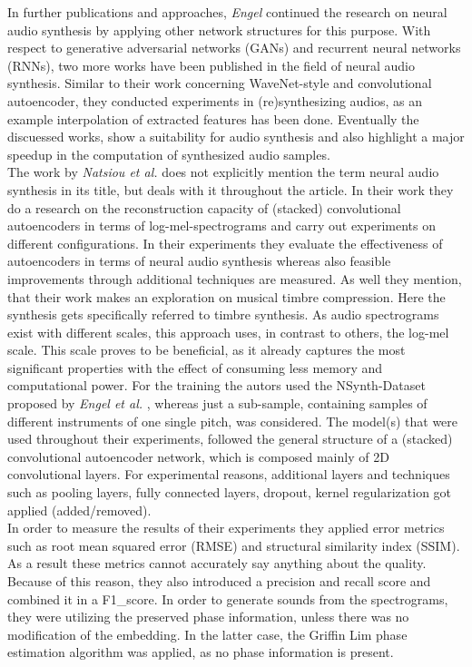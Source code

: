 In further publications and approaches, \textit{Engel} continued the research on neural audio synthesis by applying other network structures for this purpose. With respect to generative adversarial networks (GANs) and recurrent neural networks (RNNs), two more works have been published in the field of neural audio synthesis. \cite{Engel2019, hantrakul2019fast} Similar to their work concerning WaveNet-style and convolutional autoencoder, they conducted experiments in (re)synthesizing audios, as an example interpolation of extracted features has been done. Eventually the discuessed works, show a suitability for audio synthesis and also highlight a major speedup in the computation of synthesized audio samples.\\

The work by \textit{Natsiou et al.} does not explicitly mention the term neural audio synthesis in its title, but deals with it throughout the article. \cite{Natsiou2023} In their work they do a research on the reconstruction capacity of (stacked) convolutional autoencoders in terms of log-mel-spectrograms and carry out experiments on different configurations. In their experiments they evaluate the effectiveness of autoencoders in terms of neural audio synthesis whereas also feasible improvements through additional techniques are measured. As well they mention, that their work makes an exploration on musical timbre compression. Here the synthesis gets specifically referred to timbre synthesis. As audio spectrograms exist with different scales, this approach uses, in contrast to others, the log-mel scale. This scale proves to be beneficial, as it already captures the most significant properties with the effect of consuming less memory and computational power. For the training the autors used the NSynth-Dataset proposed by \textit{Engel et al. } \cite{Engel2017}, whereas just a sub-sample, containing samples of different instruments of one single pitch, was considered. The model(s) that were used throughout their experiments, followed the general structure of a (stacked) convolutional autoencoder network, which is composed mainly of 2D convolutional layers. For experimental reasons, additional layers and techniques such as pooling layers, fully connected layers, dropout, kernel regularization got applied (added/removed).\\
In order to measure the results of their experiments they applied error metrics such as root mean squared error (RMSE) and structural similarity index (SSIM). As a result these metrics cannot accurately say anything about the quality. Because of this reason, they also introduced a precision and recall score and combined it in a F1\_score. In order to generate sounds from the spectrograms, they were utilizing the preserved phase information, unless there was no modification of the embedding. In the latter case, the Griffin Lim phase estimation algorithm was applied, as no phase information is present.\\
